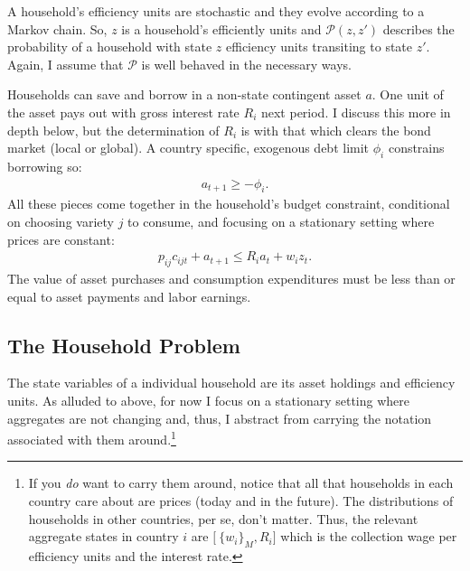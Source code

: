 \documentclass[12pt,pdftex]{article}
\begin{document}
\begin{onehalfspacing}
A household's efficiency units are stochastic and they evolve according to a Markov chain. So, $z$ is a household's efficiently units and $\mathcal{P}(z,z')$ describes the probability of a household with state $z$ efficiency units transiting to state $z'$. Again, I assume that $\mathcal{P}$ is well behaved in the necessary ways.

Households can save and borrow in a non-state contingent asset $a$. One unit of the asset pays out with gross interest rate $R_i$ next period. I discuss this more in depth below, but the determination of $R_{i}$ is with that which clears the bond market (local or global). A country specific, exogenous debt limit $\phi_{i}$ constrains borrowing so:
\begin{align}
a_{t+1} \geq - \phi_{i}.
\label{eq:borrowing-constraint}
\end{align}
All these pieces come together in the household's budget constraint, conditional on choosing variety $j$ to consume, and focusing on a stationary setting where prices are constant:
\begin{align}
p_{ij}c_{ijt} +  a_{t+1} \leq    R_{i} a_{t} + w_{i} z_{t}.\label{eq:trade-budget-constraint}
\end{align}
The value of asset purchases and consumption expenditures must be less than or equal to asset payments and labor earnings.

\subsection{The Household Problem}

The state variables of a individual household are its asset holdings and efficiency units. As alluded to above, for now I focus on a stationary setting where aggregates are not changing and, thus, I abstract from carrying the notation associated with them around.\footnote{If you \emph{do} want to carry them around, notice that all that households in each country care about are prices (today and in the future). The distributions of households in other countries, per se, don't matter. Thus, the relevant aggregate states in country $i$ are $\big [ \ \{ w_i \}_{M}, R_i \big ]$ which is the collection wage per efficiency units and the interest rate.}


\end{onehalfspacing}
\end{document}
